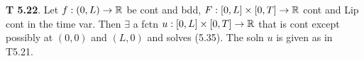 {\bf T 5.22}. Let $f: (0,L) \rightarrow \mathbb{R}$ be cont and bdd, $F: [0, L] \times [0,T] \rightarrow \mathbb{R}$ cont and Lip cont in the time var.  Then $\exists$ a fctn $u: [0,L] \times [0,T] \rightarrow \mathbb{R}$ that is cont except possibly at $(0,0)$ and $(L,0)$ and solves (5.35). The soln $u$ is given as in T5.21. 